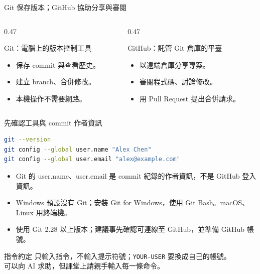 \documentclass[xetex, unicode, 10pt, aspectratio=169]{beamer}
\begin{document}
\begin{frame}{Git 保存版本；GitHub 協助分享與審閱}
    \begin{columns}[t]
        \begin{column}{0.47\textwidth}
            \begin{block}{Git：電腦上的版本控制工具}
                \begin{itemize}
                    \item 保存 commit 與查看歷史。
                    \item 建立 branch、合併修改。
                    \item 本機操作不需要網路。
                \end{itemize}
            \end{block}
        \end{column}
        \begin{column}{0.47\textwidth}
            \begin{block}{GitHub：託管 Git 倉庫的平臺}
                \begin{itemize}
                    \item 以遠端倉庫分享專案。
                    \item 審閱程式碼、討論修改。
                    \item 用 Pull Request 提出合併請求。
                \end{itemize}
            \end{block}
        \end{column}
    \end{columns}
    \begin{center}\end{center}
\end{frame}

\begin{frame}[fragile]{先確認工具與 commit 作者資訊}
\begin{lstlisting}[language=bash]
git --version
git config --global user.name "Alex Chen"
git config --global user.email "alex@example.com"
\end{lstlisting}
    \begin{itemize}
        \item Git 的 user.name、user.email 是 commit 紀錄的作者資訊，不是 GitHub 登入資訊。
        \item Windows 預設沒有 Git；安裝 Git for Windows，使用 Git Bash。macOS、Linux 用終端機。
        \item 使用 Git 2.28 以上版本；建議事先確認可連線至 GitHub，並準備 GitHub 帳號。
    \end{itemize}
    \begin{block}{指令約定}
        只輸入指令，不輸入提示符號；\texttt{YOUR-USER} 要換成自己的帳號。\\
        可以向 AI 求助，但課堂上請親手輸入每一條命令。
    \end{block}
\end{frame}
\end{document}
